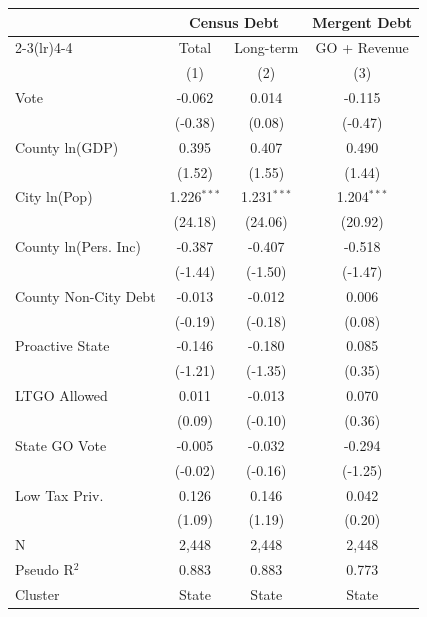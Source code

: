 \begingroup
\centering
\begin{tabular*}{\textwidth}{@{\extracolsep{\fill}}lccc}
   \toprule
                        & \multicolumn{2}{c}{Census Debt} & \multicolumn{1}{c}{Mergent Debt}\\  
   \cmidrule(lr){2-3}\cmidrule(lr){4-4}
                        & Total             & Long-term             & GO + Revenue \\   
                        & (1)               & (2)                   & (3)\\  
   \midrule 
   Vote                 & -0.062            & 0.014                 & -0.115\\   
                        & (-0.38)          & (0.08)               & (-0.47)\\   
   County ln(GDP)       & 0.395             & 0.407                 & 0.490\\   
                        & (1.52)           & (1.55)               & (1.44)\\   
   City ln(Pop)         & 1.226$^{***}$     & 1.231$^{***}$         & 1.204$^{***}$\\   
                        & (24.18)          & (24.06)              & (20.92)\\   
   County ln(Pers. Inc) & -0.387            & -0.407                & -0.518\\   
                        & (-1.44)          & (-1.50)              & (-1.47)\\   
   County Non-City Debt & -0.013            & -0.012                & 0.006\\   
                        & (-0.19)          & (-0.18)              & (0.08)\\   
   Proactive State      & -0.146            & -0.180                & 0.085\\   
                        & (-1.21)          & (-1.35)              & (0.35)\\   
   LTGO Allowed         & 0.011             & -0.013                & 0.070\\   
                        & (0.09)           & (-0.10)              & (0.36)\\   
   State GO Vote        & -0.005            & -0.032                & -0.294\\   
                        & (-0.02)          & (-0.16)              & (-1.25)\\   
   Low Tax Priv.        & 0.126             & 0.146                 & 0.042\\   
                        & (1.09)           & (1.19)               & (0.20)\\   
   \hline
   N         & 2,448             & 2,448                 & 2,448\\  
   Pseudo R$^2$         & 0.883             & 0.883                 & 0.773\\  
   Cluster              & State & State & State\\  
   \bottomrule
\end{tabular*}
\par\endgroup
